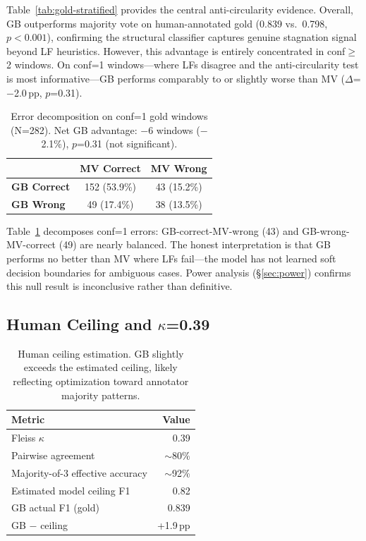 \documentclass[11pt,a4paper]{article}
\begin{document}
Table~\ref{tab:gold-stratified} provides the central anti-circularity evidence.
Overall, GB outperforms majority vote on human-annotated gold (0.839 vs.\ 0.798, $p<0.001$), confirming the structural classifier captures genuine stagnation signal beyond LF heuristics.
However, this advantage is entirely concentrated in conf$\geq$2 windows.
On conf=1 windows---where LFs disagree and the anti-circularity test is most informative---GB performs comparably to or slightly worse than MV ($\Delta$=$-$2.0\,pp, $p$=0.31).

\begin{table}[t]
\centering
\small
\begin{tabular}{lcc}
\toprule
 & \textbf{MV Correct} & \textbf{MV Wrong} \\
\midrule
\textbf{GB Correct} & 152 (53.9\%) & 43 (15.2\%) \\
\textbf{GB Wrong} & 49 (17.4\%) & 38 (13.5\%) \\
\bottomrule
\end{tabular}
\caption{Error decomposition on conf=1 gold windows (N=282). Net GB advantage: $-$6 windows ($-$2.1\%), $p$=0.31 (not significant).}
\label{tab:error-decomp}
\end{table}

Table~\ref{tab:error-decomp} decomposes conf=1 errors: GB-correct-MV-wrong (43) and GB-wrong-MV-correct (49) are nearly balanced.
The honest interpretation is that GB performs no better than MV where LFs fail---the model has not learned soft decision boundaries for ambiguous cases.
Power analysis (\S\ref{sec:power}) confirms this null result is inconclusive rather than definitive.

\subsection{Human Ceiling and $\kappa$=0.39}
\label{sec:ceiling}

\begin{table}[t]
\centering
\small
\begin{tabular}{lr}
\toprule
\textbf{Metric} & \textbf{Value} \\
\midrule
Fleiss $\kappa$ & 0.39 \\
Pairwise agreement & $\sim$80\% \\
Majority-of-3 effective accuracy & $\sim$92\% \\
Estimated model ceiling F1 & 0.82 \\
GB actual F1 (gold) & 0.839 \\
GB $-$ ceiling & +1.9\,pp \\
\bottomrule
\end{tabular}
\caption{Human ceiling estimation. GB slightly exceeds the estimated ceiling, likely reflecting optimization toward annotator majority patterns.}
\label{tab:ceiling}
\end{table}
\end{document}

